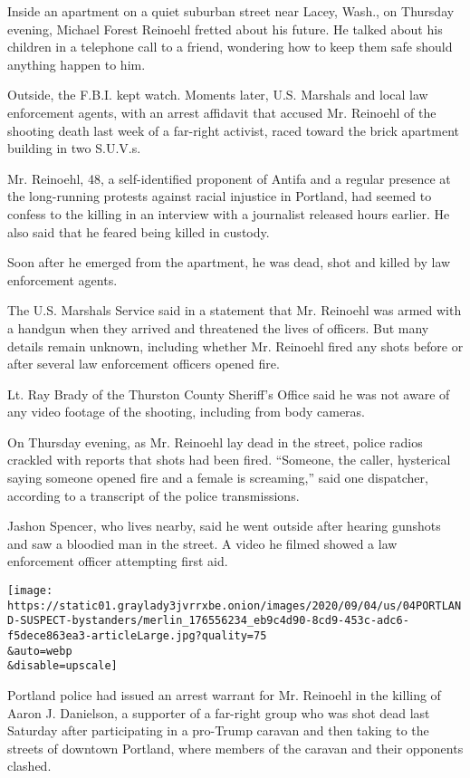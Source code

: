 Inside an apartment on a quiet suburban street near Lacey, Wash., on
Thursday evening, Michael Forest Reinoehl fretted about his future. He
talked about his children in a telephone call to a friend, wondering how
to keep them safe should anything happen to him.

Outside, the F.B.I. kept watch. Moments later, U.S. Marshals and local
law enforcement agents, with an arrest affidavit that accused Mr.
Reinoehl of the shooting death last week of a far-right activist, raced
toward the brick apartment building in two S.U.V.s.

Mr. Reinoehl, 48, a self-identified proponent of Antifa and a regular
presence at the long-running protests against racial injustice in
Portland, had seemed to confess to the killing in an interview with a
journalist released hours earlier. He also said that he feared being
killed in custody.

Soon after he emerged from the apartment, he was dead, shot and killed
by law enforcement agents.

The U.S. Marshals Service said in a statement that Mr. Reinoehl was
armed with a handgun when they arrived and threatened the lives of
officers. But many details remain unknown, including whether Mr.
Reinoehl fired any shots before or after several law enforcement
officers opened fire.

Lt. Ray Brady of the Thurston County Sheriff's Office said he was not
aware of any video footage of the shooting, including from body cameras.

On Thursday evening, as Mr. Reinoehl lay dead in the street, police
radios crackled with reports that shots had been fired. ``Someone, the
caller, hysterical saying someone opened fire and a female is
screaming,'' said one dispatcher, according to a transcript of the
police transmissions.

Jashon Spencer, who lives nearby, said he went outside after hearing
gunshots and saw a bloodied man in the street. A video he filmed showed
a law enforcement officer attempting first aid.

\texttt{[image: https://static01.graylady3jvrrxbe.onion/images/2020/09/04/us/04PORTLAND-SUSPECT-bystanders/merlin\_176556234\_eb9c4d90-8cd9-453c-adc6-f5dece863ea3-articleLarge.jpg?quality=75\\\&auto=webp\\\&disable=upscale]}

Portland police had issued an arrest warrant for Mr. Reinoehl in the
killing of Aaron J. Danielson, a supporter of a far-right group who was
shot dead last Saturday after participating in a pro-Trump caravan and
then taking to the streets of downtown Portland, where members of the
caravan and their opponents clashed.

